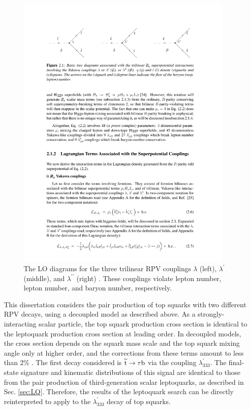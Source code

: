 \begin{figure}[hbt]
\begin{center}
\includegraphics[width=0.95\textwidth]{figures/0406039v2_trilinear.pdf}
\caption{The LO diagrams for the three trilinear RPV couplings $\lambda$ (left), $\lambda^{\prime}$ (middle), and $\lambda^{\prime \prime}$ (right) \cite{Barbier}. These couplings violate lepton number, lepton number, and baryon number, respectively.}
\label{fig:trilinear-RPV}
\end{center}
\end{figure}

This dissertation considers the pair production of top squarks with two different RPV decays, using a decoupled model as described above. As a strongly-interacting scalar particle, the top squark production cross section is identical to the leptoquark production cross section at leading order. In decoupled models, the cross section depends on the squark mass scale and the top squark mixing angle only at higher order, and the corrections from these terms amount to less than 2\% \cite{StopCrossSec}. The first decay considered is $\widetilde{\mathrm{t}} \rightarrow \tau \mathrm{b}$ via the coupling $\lambda_{333}^{\prime}$. The final-state signature and kinematic distributions of this signal are identical to those from the pair production of third-generation scalar leptoquarks, as described in Sec. \ref{sec:LQ}. Therefore, the results of the leptoquark search can be directly reinterpreted to apply to the $\lambda_{333}^{\prime}$ decay of top squarks.

